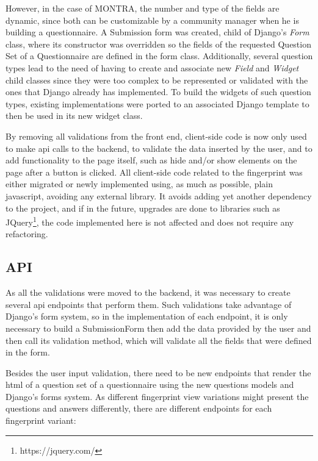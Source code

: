 However, in the case of MONTRA, the number and type of the fields are dynamic, since both can be customizable by a community manager when he is building a questionnaire.
A Submission form was created, child of Django's \textit{Form} class, where its constructor was overridden so the fields of the requested Question Set of a Questionnaire are defined in the form class.
Additionally, several question types lead to the need of having to create and associate new \textit{Field} and \textit{Widget} child classes since they were too complex to be represented or validated with the ones that Django already has implemented.
To build the widgets of such question types, existing implementations were ported to an associated Django template to then be used in its new widget class.

By removing all validations from the front end, client-side code is now only used to make \gls{api} calls to the backend, to validate the data inserted by the user, and to add functionality to the page itself, such as hide and/or show elements on the page after a button is clicked.
All client-side code related to the fingerprint was either migrated or newly implemented using, as much as possible, plain javascript, avoiding any external library.
It avoids adding yet another dependency to the project, and if in the future, upgrades are done to libraries such as JQuery\footnote{https://jquery.com/}, the code implemented here is not affected and does not require any refactoring.

\subsection{API}

As all the validations were moved to the backend, it was necessary to create several \gls{api} endpoints that perform them.
Such validations take advantage of Django's form system, so in the implementation of each endpoint, it is only necessary to build a SubmissionForm then add the data provided by the user and then call its validation method, which will validate all the fields that were defined in the form.

Besides the user input validation, there need to be new endpoints that render the \gls{html} of a question set of a questionnaire using the new questions models and Django's forms system.
As different fingerprint view variations might present the questions and answers differently, there are different endpoints for each fingerprint variant:

